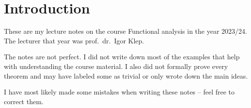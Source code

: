 \section*{Introduction}

These are my lecture notes on the course Functional analysis in the
year 2023/24. The lecturer that year was prof.~dr.~Igor Klep.

The notes are not perfect. I did not write down most of the examples
that help with understanding the course material. I also did not
formally prove every theorem and may have labeled some as trivial or
only wrote down the main ideas.

I have most likely made some mistakes when writing these notes --
feel free to correct them.
